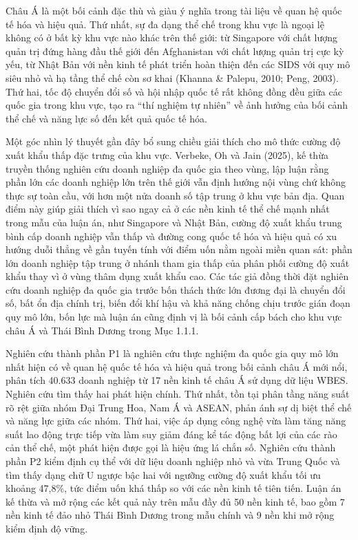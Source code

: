 \documentclass[
  a4paper,
  13pt]{extreport}
\begin{document}
Châu Á là một bối cảnh đặc thù và giàu ý nghĩa trong tài liệu về quan hệ
quốc tế hóa và hiệu quả. Thứ nhất, sự đa dạng thể chế trong khu vực là
ngoại lệ không có ở bất kỳ khu vực nào khác trên thế giới: từ Singapore
với chất lượng quản trị đứng hàng đầu thế giới đến Afghanistan với chất
lượng quản trị cực kỳ yếu, từ Nhật Bản với nền kinh tế phát triển hoàn
thiện đến các SIDS với quy mô siêu nhỏ và hạ tầng thể chế còn sơ khai
(Khanna \& Palepu, 2010; Peng, 2003). Thứ hai, tốc độ chuyển đổi số và
hội nhập quốc tế rất không đồng đều giữa các quốc gia trong khu vực, tạo
ra ``thí nghiệm tự nhiên'' về ảnh hưởng của bối cảnh thể chế và năng lực
số đến kết quả quốc tế hóa.

Một góc nhìn lý thuyết gần đây bổ sung chiều giải thích cho mô thức
cường độ xuất khẩu thấp đặc trưng của khu vực. Verbeke, Oh và Jain
(2025), kế thừa truyền thống nghiên cứu doanh nghiệp đa quốc gia theo
vùng, lập luận rằng phần lớn các doanh nghiệp lớn trên thế giới vẫn định
hướng nội vùng chứ không thực sự toàn cầu, với hơn một nửa doanh số tập
trung ở khu vực bản địa. Quan điểm này giúp giải thích vì sao ngay cả ở
các nền kinh tế thể chế mạnh nhất trong mẫu của luận án, như Singapore
và Nhật Bản, cường độ xuất khẩu trung bình cấp doanh nghiệp vẫn thấp và
đường cong quốc tế hóa và hiệu quả có xu hướng duỗi thẳng về gần tuyến
tính với điểm uốn nằm ngoài miền quan sát: phần lớn doanh nghiệp tập
trung ở nhánh tham gia thấp của phân phối cường độ xuất khẩu thay vì ở
vùng thâm dụng xuất khẩu cao. Các tác giả đồng thời đặt nghiên cứu doanh
nghiệp đa quốc gia trước bốn thách thức lớn đương đại là chuyển đổi số,
bất ổn địa chính trị, biến đổi khí hậu và khả năng chống chịu trước gián
đoạn quy mô lớn, bốn lực mà luận án cũng định vị là bối cảnh cấp bách
cho khu vực châu Á và Thái Bình Dương trong Mục 1.1.1.

Nghiên cứu thành phần P1 là nghiên cứu thực nghiệm đa quốc gia quy mô
lớn nhất hiện có về quan hệ quốc tế hóa và hiệu quả trong bối cảnh châu
Á mới nổi, phân tích 40.633 doanh nghiệp từ 17 nền kinh tế châu Á sử
dụng dữ liệu WBES. Nghiên cứu tìm thấy hai phát hiện chính. Thứ nhất,
tồn tại phân tầng năng suất rõ rệt giữa nhóm Đại Trung Hoa, Nam Á và
ASEAN, phản ánh sự dị biệt thể chế và năng lực giữa các nhóm. Thứ hai,
việc áp dụng công nghệ vừa làm tăng năng suất lao động trực tiếp vừa làm
suy giảm đáng kể tác động bất lợi của các rào cản thể chế, một phát hiện
được gọi là hiệu ứng lá chắn số. Nghiên cứu thành phần P2 kiểm định cụ
thể với dữ liệu doanh nghiệp nhỏ và vừa Trung Quốc và tìm thấy dạng chữ
U ngược bậc hai với ngưỡng cường độ xuất khẩu tối ưu khoảng 47,8\%, tức
điểm uốn khá thấp so với các nền kinh tế tiên tiến. Luận án kế thừa và
mở rộng các kết quả này trên mẫu đầy đủ 50 nền kinh tế, bao gồm 7 nền
kinh tế đảo nhỏ Thái Bình Dương trong mẫu chính và 9 nền khi mở rộng
kiểm định độ vững.
\end{document}
